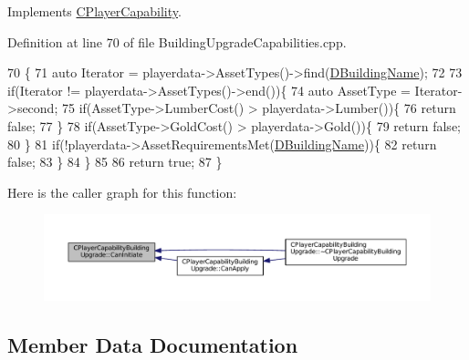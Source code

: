 Implements \hyperlink{classCPlayerCapability_aa83b1e1fcaff2985c378132d679154ea}{C\+Player\+Capability}.



Definition at line 70 of file Building\+Upgrade\+Capabilities.\+cpp.


\begin{DoxyCode}
70                                                                                                            
                         \{
71     \textcolor{keyword}{auto} Iterator = playerdata->AssetTypes()->find(\hyperlink{classCPlayerCapabilityBuildingUpgrade_a244e767a3e669441cfb03c13bf703e64}{DBuildingName});
72     
73     \textcolor{keywordflow}{if}(Iterator != playerdata->AssetTypes()->end())\{
74         \textcolor{keyword}{auto} AssetType = Iterator->second;
75         \textcolor{keywordflow}{if}(AssetType->LumberCost() > playerdata->Lumber())\{
76             \textcolor{keywordflow}{return} \textcolor{keyword}{false};   
77         \}
78         \textcolor{keywordflow}{if}(AssetType->GoldCost() > playerdata->Gold())\{
79             \textcolor{keywordflow}{return} \textcolor{keyword}{false};   
80         \}
81         \textcolor{keywordflow}{if}(!playerdata->AssetRequirementsMet(\hyperlink{classCPlayerCapabilityBuildingUpgrade_a244e767a3e669441cfb03c13bf703e64}{DBuildingName}))\{
82             \textcolor{keywordflow}{return} \textcolor{keyword}{false};
83         \}
84     \}
85     
86     \textcolor{keywordflow}{return} \textcolor{keyword}{true};
87 \}
\end{DoxyCode}
Here is the caller graph for this function\+:
\nopagebreak
\begin{figure}[H]
\begin{center}
\leavevmode
\includegraphics[width=350pt]{classCPlayerCapabilityBuildingUpgrade_af515cec6f1a28607864c853307e17d7c_icgraph}
\end{center}
\end{figure}


\subsection{Member Data Documentation}
\hypertarget{classCPlayerCapabilityBuildingUpgrade_a244e767a3e669441cfb03c13bf703e64}{}\label{classCPlayerCapabilityBuildingUpgrade_a244e767a3e669441cfb03c13bf703e64} 
